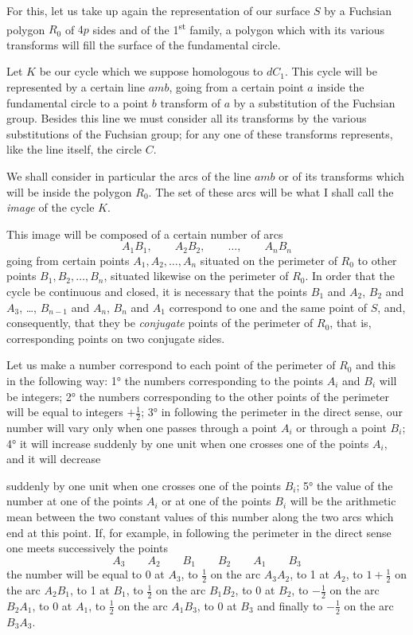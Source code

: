 \documentclass{article}
\begin{document}
For this, let us take up again the representation of our surface $S$ by a Fuchsian polygon $R_{0}$ of $4p$ sides and of the 1\textsuperscript{st} family, a polygon which with its various transforms will fill the surface of the fundamental circle.

Let $K$ be our cycle which we suppose homologous to $dC_{1}$. This cycle will be represented by a certain line $amb$, going from a certain point $a$ inside the fundamental circle to a point $b$ transform of $a$ by a substitution of the Fuchsian group. Besides this line we must consider all its transforms by the various substitutions of the Fuchsian group; for any one of these transforms represents, like the line itself, the circle $C$.

We shall consider in particular the arcs of the line $amb$ or of its transforms which will be inside the polygon $R_{0}$. The set of these arcs will be what I shall call the \emph{image} of the cycle $K$.

This image will be composed of a certain number of arcs
\[ A_{1}B_{1}, \qquad A_{2}B_{2}, \qquad \ldots, \qquad A_{n}B_{n} \]
going from certain points $A_{1}, A_{2}, \ldots, A_{n}$ situated on the perimeter of $R_{0}$ to other points $B_{1}, B_{2}, \ldots, B_{n}$, situated likewise on the perimeter of $R_{0}$. In order that the cycle be continuous and closed, it is necessary that the points $B_{1}$ and $A_{2}$, $B_{2}$ and $A_{3}$, \ldots, $B_{n-1}$ and $A_{n}$, $B_{n}$ and $A_{1}$ correspond to one and the same point of $S$, and, consequently, that they be \emph{conjugate} points of the perimeter of $R_{0}$, that is, corresponding points on two conjugate sides.

Let us make a number correspond to each point of the perimeter of $R_{0}$ and this in the following way: 1° the numbers corresponding to the points $A_{i}$ and $B_{i}$ will be integers; 2° the numbers corresponding to the other points of the perimeter will be equal to integers $+ \frac{1}{2}$; 3° in following the perimeter in the direct sense, our number will vary only when one passes through a point $A_{i}$ or through a point $B_{i}$; 4° it will increase suddenly by one unit when one crosses one of the points $A_{i}$, and it will decrease

suddenly by one unit when one crosses one of the points $B_{i}$; 5° the value of the number at one of the points $A_{i}$ or at one of the points $B_{i}$ will be the arithmetic mean between the two constant values of this number along the two arcs which end at this point. If, for example, in following the perimeter in the direct sense one meets successively the points
\[ A_{3} \qquad A_{2} \qquad B_{1} \qquad B_{2} \qquad A_{1} \qquad B_{3} \]
the number will be equal to 0 at $A_{3}$, to $\frac{1}{2}$ on the arc $A_{3}A_{2}$, to 1 at $A_{2}$, to $1 + \frac{1}{2}$ on the arc $A_{2}B_{1}$, to 1 at $B_{1}$, to $\frac{1}{2}$ on the arc $B_{1}B_{2}$, to 0 at $B_{2}$, to $-\frac{1}{2}$ on the arc $B_{2}A_{1}$, to 0 at $A_{1}$, to $\frac{1}{2}$ on the arc $A_{1}B_{3}$, to 0 at $B_{3}$ and finally to $-\frac{1}{2}$ on the arc $B_{3}A_{3}$.
\end{document}
